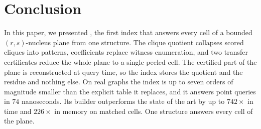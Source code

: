\section{Conclusion}\label{sec:conclusion}
In this paper, we presented \nsi, the first index that answers every cell of a bounded $(r,s)$-nucleus plane from one structure.
%
The clique quotient collapses scored cliques into patterns, coefficients replace witness enumeration, and two transfer certificates reduce the whole plane to a single peeled cell.
%
The certified part of the plane is reconstructed at query time, so the index stores the quotient and the residue and nothing else.
%
On real graphs the index is up to seven orders of magnitude smaller than the explicit table it replaces, and it answers point queries in $74$ nanoseconds.
%
Its builder outperforms the state of the art by up to $742\times$ in time and $226\times$ in memory on matched cells.
%
One structure answers every cell of the plane.
